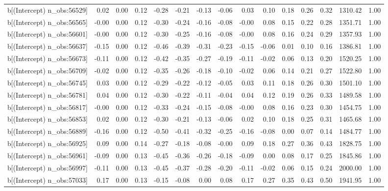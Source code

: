 \begin{table}[ht]
\begin{tabular}{rrrrrrrrrrrrrrr}
  b[(Intercept) n\_obs:56529] & 0.02 & 0.00 & 0.12 & -0.28 & -0.21 & -0.13 & -0.06 & 0.03 & 0.10 & 0.18 & 0.26 & 0.32 & 1310.42 & 1.00 \\ 
  b[(Intercept) n\_obs:56565] & -0.00 & 0.00 & 0.12 & -0.30 & -0.24 & -0.16 & -0.08 & -0.00 & 0.08 & 0.15 & 0.22 & 0.28 & 1351.71 & 1.00 \\ 
  b[(Intercept) n\_obs:56601] & -0.00 & 0.00 & 0.12 & -0.30 & -0.25 & -0.16 & -0.08 & -0.00 & 0.08 & 0.16 & 0.24 & 0.29 & 1357.93 & 1.00 \\ 
  b[(Intercept) n\_obs:56637] & -0.15 & 0.00 & 0.12 & -0.46 & -0.39 & -0.31 & -0.23 & -0.15 & -0.06 & 0.01 & 0.10 & 0.16 & 1386.81 & 1.00 \\ 
  b[(Intercept) n\_obs:56673] & -0.11 & 0.00 & 0.12 & -0.42 & -0.35 & -0.27 & -0.19 & -0.11 & -0.02 & 0.06 & 0.13 & 0.20 & 1520.25 & 1.00 \\ 
  b[(Intercept) n\_obs:56709] & -0.02 & 0.00 & 0.12 & -0.35 & -0.26 & -0.18 & -0.10 & -0.02 & 0.06 & 0.14 & 0.21 & 0.27 & 1522.80 & 1.00 \\ 
  b[(Intercept) n\_obs:56745] & 0.03 & 0.00 & 0.12 & -0.29 & -0.22 & -0.12 & -0.05 & 0.03 & 0.11 & 0.18 & 0.26 & 0.30 & 1501.10 & 1.00 \\ 
  b[(Intercept) n\_obs:56781] & 0.04 & 0.00 & 0.12 & -0.30 & -0.22 & -0.11 & -0.04 & 0.04 & 0.12 & 0.19 & 0.26 & 0.33 & 1489.58 & 1.00 \\ 
  b[(Intercept) n\_obs:56817] & -0.00 & 0.00 & 0.12 & -0.33 & -0.24 & -0.15 & -0.08 & -0.00 & 0.08 & 0.16 & 0.23 & 0.30 & 1454.75 & 1.00 \\ 
  b[(Intercept) n\_obs:56853] & 0.02 & 0.00 & 0.12 & -0.30 & -0.21 & -0.13 & -0.06 & 0.02 & 0.10 & 0.18 & 0.25 & 0.31 & 1465.68 & 1.00 \\ 
  b[(Intercept) n\_obs:56889] & -0.16 & 0.00 & 0.12 & -0.50 & -0.41 & -0.32 & -0.25 & -0.16 & -0.08 & 0.00 & 0.07 & 0.14 & 1484.77 & 1.00 \\ 
  b[(Intercept) n\_obs:56925] & 0.09 & 0.00 & 0.14 & -0.27 & -0.18 & -0.08 & -0.00 & 0.09 & 0.18 & 0.27 & 0.36 & 0.43 & 1828.75 & 1.00 \\ 
  b[(Intercept) n\_obs:56961] & -0.09 & 0.00 & 0.13 & -0.45 & -0.36 & -0.26 & -0.18 & -0.09 & 0.00 & 0.08 & 0.17 & 0.25 & 1845.86 & 1.00 \\ 
  b[(Intercept) n\_obs:56997] & -0.11 & 0.00 & 0.13 & -0.45 & -0.37 & -0.28 & -0.20 & -0.11 & -0.02 & 0.06 & 0.15 & 0.24 & 2000.00 & 1.00 \\ 
  b[(Intercept) n\_obs:57033] & 0.17 & 0.00 & 0.13 & -0.15 & -0.08 & 0.00 & 0.08 & 0.17 & 0.27 & 0.35 & 0.43 & 0.50 & 1941.95 & 1.00 \\ 

\end{tabular}
\end{table}
